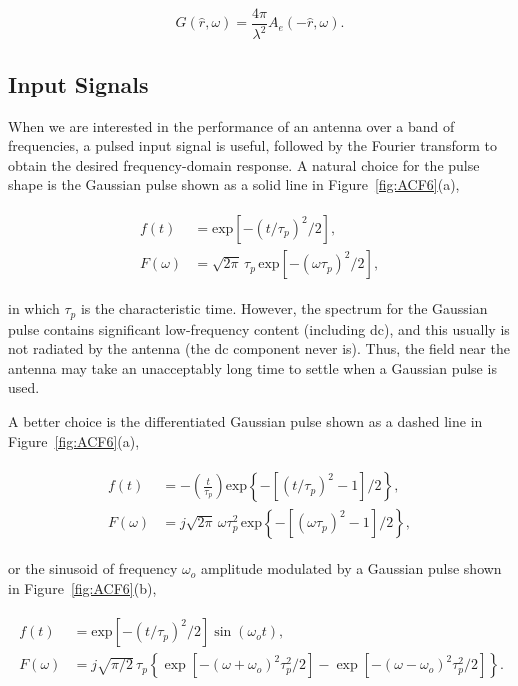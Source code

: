 \begin{equation}
G(\hat{r},\omega) = \frac{4\pi}{\lambda^2} A_e(-\hat{r},\omega) .
\label{eqn:ACE18}
\end{equation}

\subsection{Input Signals}

When we are interested in the performance of an antenna over a band of frequencies, a pulsed input signal is useful, followed by the Fourier transform to obtain the desired frequency-domain response.  A natural choice for the pulse shape is the Gaussian pulse shown as a solid line in Figure~\ref{fig:ACF6}(a),

\begin{align}
\begin{split}
f(t) & =\text{exp} \left[ -(t/\tau_p)^2 / 2 \right], \\
F(\omega) & =\sqrt{2\pi}\,\tau_p\,\text{exp}\left[-(\omega \tau_p)^2/2 \right],
\end{split}
\label{eqn:ACE19}
\end{align}

\noindent in which $\tau_p$ is the characteristic time.  However, the spectrum for the Gaussian pulse contains significant low-frequency content (including dc), and this usually is not radiated by the antenna (the dc component never is).  Thus, the field near the antenna may take an unacceptably long time to settle when a Gaussian pulse is used.

A better choice is the differentiated Gaussian pulse shown as a dashed line in Figure~\ref{fig:ACF6}(a),

\begin{align}
\begin{split}
f(t) & =-\left( \frac{t}{\tau_p} \right) \text{exp} \left\{ -\left[ (t/\tau_p)^2-1 \right] / 2 \right\}, \\
F(\omega) & =j\sqrt{2\pi}\,\omega \tau^2_p\,\text{exp}\left\{-\left[(\omega \tau_p)^2-1\right]/2 \right\},
\end{split}
\label{eqn:ACE20}
\end{align}

\noindent or the sinusoid of frequency $\omega_o$ amplitude modulated by a Gaussian pulse shown in Figure~\ref{fig:ACF6}(b),

\begin{align}
\begin{split}
f(t) & =\text{exp} \left[ -(t/\tau_p)^2 / 2 \right] \sin(\omega_o t), \\
F(\omega) & =j\sqrt{\pi/2}\,\tau_p \left\{ \exp\left[ -(\omega+\omega_o)^2\tau^2_p / 2 \right] - \exp\left[ -(\omega-\omega_o)^2\tau^2_p / 2 \right] \right\}.
\end{split}
\label{eqn:ACE21}
\end{align}

